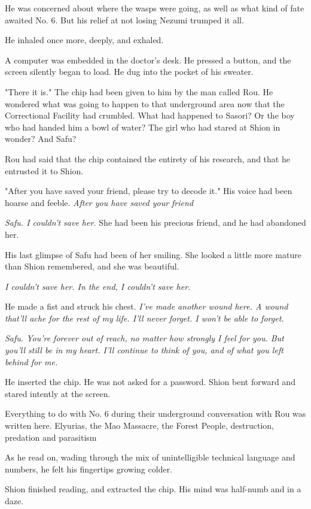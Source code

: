 He was concerned about where the wasps were going, as well as what kind
of fate awaited No. 6. But his relief at not losing Nezumi trumped it
all.

He inhaled once more, deeply, and exhaled.

A computer was embedded in the doctor's desk. He pressed a button, and
the screen silently began to load. He dug into the pocket of his
sweater.

"There it is." The chip had been given to him by the man called Rou. He
wondered what was going to happen to that underground area now that the
Correctional Facility had crumbled. What had happened to Sasori? Or the
boy who had handed him a bowl of water? The girl who had stared at Shion
in wonder? And Safu?

Rou had said that the chip contained the entirety of his research, and
that he entrusted it to Shion.

"After you have saved your friend, please try to decode it." His voice
had been hoarse and feeble. \emph{After you have saved your friend\el }

\emph{Safu. I couldn't save her.} She had been his precious friend, and he had
abandoned her.

His last glimpse of Safu had been of her smiling. She looked a little
more mature than Shion remembered, and she was beautiful.

\emph{I couldn't save her. In the end, I couldn't save her.}

He made a fist and struck his chest. \emph{I've made another wound here. A
wound that'll ache for the rest of my life. I'll never forget. I won't
be able to forget.}

\emph{Safu. You're forever out of reach, no matter how strongly I feel for
you. But you'll still be in my heart. I'll continue to think of you, and
of what you left behind for me.}

He inserted the chip. He was not asked for a password. Shion bent
forward and stared intently at the screen.

Everything to do with No. 6 during their underground conversation with
Rou was written here. Elyurias, the Mao Massacre, the Forest People,
destruction, predation and parasitism\el 

As he read on, wading through the mix of unintelligible technical
language and numbers, he felt his fingertips growing colder.

Shion finished reading, and extracted the chip. His mind was half-numb
and in a daze.

